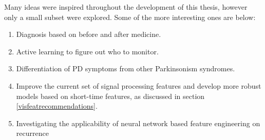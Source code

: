 \documentclass[12pt, twoside]{book}
\begin{document}
Many ideas were inspired throughout the development of this thesis, however only a small subset were explored. Some of the more interesting ones are below:


\begin{enumerate}[noitemsep, topsep=-10pt]
	\item Diagnosis based on before and after medicine.
	\item Active learning to figure out who to monitor.
	\item Differentiation of PD symptoms from other Parkinsonism syndromes.
	\item Improve the current set of signal processing features and develop more robust models based on short-time features, as discussed in section \ref{visfeatrecommendations}.
	\item Investigating the applicability of neural network based feature engineering on recurrence 
\end{enumerate}


\backmatter


\end{document}
